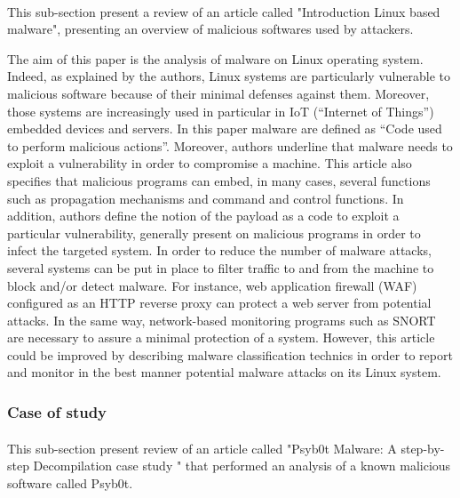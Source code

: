 \paragraph{}

This sub-section present a review of an article called "Introduction Linux based malware",
presenting an overview of malicious softwares used by attackers.

The aim of this paper is the analysis of malware on Linux operating system. Indeed, as
explained by the authors, Linux systems are particularly vulnerable to malicious software
because of their minimal defenses against them. Moreover, those systems are increasingly
used in particular in IoT (“Internet of Things”) embedded devices and servers. In this paper
malware are defined as “Code used to perform malicious actions”. Moreover, authors underline
that malware needs to exploit a vulnerability in order to compromise a machine. This
article also specifies that malicious programs can embed, in many cases, several functions
such as propagation mechanisms and command and control functions. In addition, authors 
define the notion of the payload as a code to exploit a particular vulnerability, generally
present on malicious programs in order to infect the targeted system.  
In order to reduce the number of malware attacks, several systems can be put in place to
filter traffic to and from the machine to block and/or detect malware. For instance, web
application firewall (WAF) configured as an HTTP reverse proxy can protect a web server
from potential attacks. In the same way, network-based monitoring programs such as SNORT
are necessary to assure a minimal protection of a system.
However, this article could be improved by describing malware classification technics
in order to report and monitor in the best manner potential malware attacks on its Linux
system.

\subsubsection{Case of study} %

\paragraph{}

This sub-section present review of an article called "Psyb0t Malware: A step-by-step
Decompilation case study " that performed an analysis of a known malicious software
called Psyb0t. 

